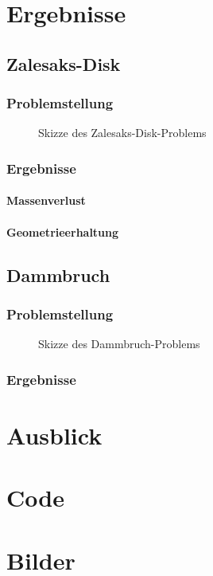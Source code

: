 
\chapter{Ergebnisse}
\section{Zalesaks-Disk}
\subsection{Problemstellung}

\def\svgwidth{0.4\textwidth}
\begin{figure}[ht]
\centering
\caption{Skizze des Zalesaks-Disk-Problems}
\end{figure} 

\subsection{Ergebnisse}
\subsubsection{Massenverlust}
\subsubsection{Geometrieerhaltung}

\section{Dammbruch}
\subsection{Problemstellung}

\def\svgwidth{0.6\textwidth}
\begin{figure}[ht]
\centering
  \caption{Skizze des Dammbruch-Problems}
\end{figure}

\subsection{Ergebnisse}



\chapter{Ausblick}

\appendix

\chapter{Code}
\chapter{Bilder}

\clearpage
{}





